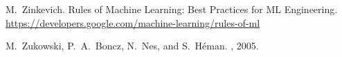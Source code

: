 \documentclass[11pt]{article}
\begin{document}
\begin{small}
\begin{thebibliography}{10}
M.~Zinkevich.
\newblock Rules of Machine Learning: Best Practices for {ML} Engineering.
\newblock \url{https://developers.google.com/machine-learning/rules-of-ml}

M.~Zukowski, P.~A.~Boncz, N.~Nes, and S.~H\'{e}man.
, 2005.












\end{thebibliography}
\end{small}
\end{document}
